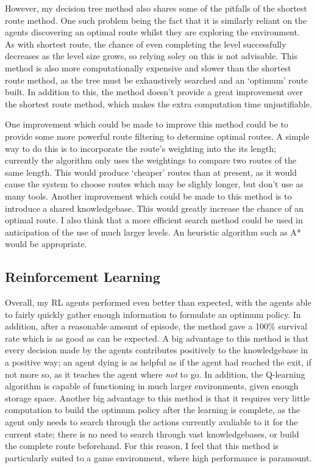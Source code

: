 \documentclass[a4paper,oneside]{report}
\begin{document}
However, my decision tree method also shares some of the pitfalls of the shortest route method. One such problem being the fact that it is similarly reliant on the agents discovering an optimal route whilst they are exploring the environment. As with shortest route, the chance of even completing the level successfully decreases as the level size grows, so relying soley on this is not advisable. This method is also more computationally expensive and slower than the shortest route method, as the tree must be exhaustively searched and an `optimum' route built. In addition to this, the method doesn't provide a great improvement over the shortest route method, which makes the extra computation time unjustifiable.

One improvement which could be made to improve this method could be to provide some more powerful route filtering to determine optimal routes. A simple way to do this is to incorporate the route's weighting into the its length; currently the algorithm only uses the weightings to compare two routes of the same length. This would produce `cheaper' routes than at present, as it would cause the system to choose routes which may be slighly longer, but don't use as many tools. Another improvement which could be made to this method is to introduce a shared knowledgebase. This would greatly increase the chance of an optimal route. I also think that a more efficient search method could be used in anticipation of the use of much larger levels. An heuristic algorithm such as A* would be appropriate.

\subsection{Reinforcement Learning}

Overall, my RL agents performed even better than expected, with the agents able to fairly quickly gather enough information to formulate an optimum policy. In addition, after a reasonable amount of episode, the method gave a 100\% survival rate which is as good as can be expected. A big advantage to this method is that every decision made by the agents contributes positively to the knowledgebase in a positive way; an agent dying is as helpful as if the agent had reached the exit, if not more so, as it teaches the agent where \emph{not} to go. In addition, the Q-learning algorithm is capable of functioning in much larger environments, given enough storage space. Another big advantage to this method is that it requires very little computation to build the optimum policy after the learning is complete, as the agent only needs to search through the actions currently avaliable to it for the current state; there is no need to search through vast knowledgebases, or build the complete route beforehand. For this reason, I feel that this method is particularly suited to a game environment, where high performance is paramount.
\end{document}
